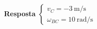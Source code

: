 \textbf{Resposta}
$
\begin{cases}
v_{C}=\SI{-3}{\meter/\second}\\
\omega_{BC}=\SI{10}{\radian/\second}
\end{cases}
$